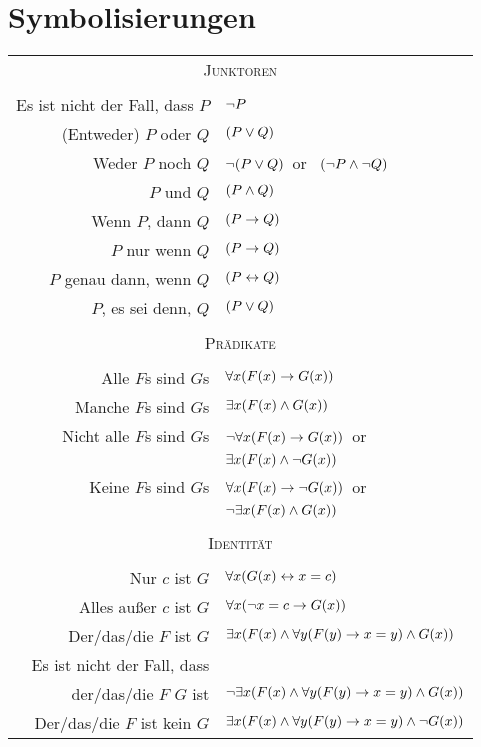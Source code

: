 \section{Symbolisierungen}
\begin{center}
\label{app.symbolization}
\begin{tabular*}{\textwidth}{rl}
\multicolumn{2}{c}{\textsc{Junktoren}}\\ \\
Es ist nicht der Fall, dass $P$ & $\neg P$\\
(Entweder) $P$ oder $Q$ & $(P \vee Q)$\\
Weder $P$ noch $Q$ & $\neg(P \vee Q)$\ or \ $(\neg P \wedge \neg Q)$\\
$P$ und $Q$ & $(P \wedge Q)$\\
Wenn $P$, dann $Q$ & $(P \rightarrow Q)$\\
$P$ nur wenn $Q$ & $(P \rightarrow Q)$\\
$P$ genau dann, wenn $Q$ & $(P \leftrightarrow Q)$\\
$P$, es sei denn, $Q$ & $(P \vee Q)$\\
\\
\multicolumn{2}{c}{\label{SymbolizingPredicates}\textsc{Prädikate}}\\ \\
Alle $F$s sind $G$s & $\forall x(\mathord{F}(x) \rightarrow \mathord{G}(x))$\\
Manche $F$s sind $G$s & $\exists x(\mathord{F}(x) \wedge \mathord{G}(x))$\\
Nicht alle $F$s sind $G$s & $\neg\forall x(\mathord{F}(x) \rightarrow \mathord{G}(x))$\ or\\
& $\exists x(\mathord{F}(x) \wedge \neg \mathord{G}(x))$\\
Keine $F$s sind $G$s & $\forall x(\mathord{F}(x) \rightarrow\neg \mathord{G}(x))$\ or\\
& $\neg\exists x(\mathord{F}(x) \wedge \mathord{G}(x))$\\
\\
\multicolumn{2}{c}{\textsc{Identität}}\\ \\
Nur $c$ ist $G$ & $\forall x(\mathord{G}(x) \leftrightarrow x=c)$\\
Alles au{\ss}er $c$ ist $G$ & $\forall x(\neg x = c \rightarrow \mathord{G}(x) )$\\
Der/das/die $F$ ist $G$ & $\exists x(\mathord{F}(x) \wedge \forall y(\mathord{F}(y) \rightarrow x=y) \wedge \mathord{G}(x) )$\\
Es ist nicht der Fall, dass\\
 der/das/die $F$ $G$ ist & $\neg\exists x(\mathord{F}(x) \wedge \forall y(\mathord{F}(y) \rightarrow x=y) \wedge \mathord{G}(x) )$\\
Der/das/die $F$ ist kein $G$ & $\exists x(\mathord{F}(x) \wedge \forall y(\mathord{F}(y) \rightarrow x=y) \wedge \neg \mathord{G}(x) )$
\end{tabular*}
\end{center}






